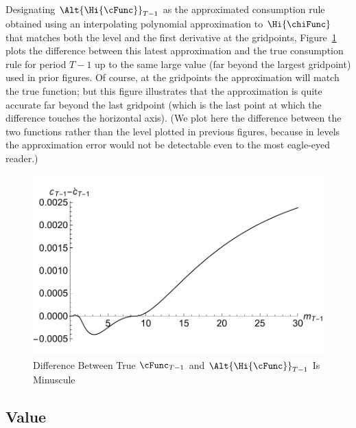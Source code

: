 \documentclass[titlepage, headings=optiontotocandhead]{\econtex}
\begin{document}
Designating $\Alt{\Hi{\cFunc}}_{T-1}$ as the approximated consumption rule
obtained using an interpolating polynomial approximation to $\Hi{\chiFunc}$
that matches both the level and the first derivative at the
gridpoints, Figure~\ref{fig:IntExpFOCInvPesReaOptGapPlot} plots the
difference between this latest approximation and the true consumption
rule for period $T-1$ up to the same large value (far beyond the
largest gridpoint) used in prior figures.  Of course, at the
gridpoints the approximation will match the true function; but this
figure illustrates that the approximation is quite accurate far beyond
the last gridpoint (which is the last point at which the difference
touches the horizontal axis).  (We plot here the difference between the
two functions rather than the level plotted in previous figures, because
in levels the approximation error would not be detectable even to the
most eagle-eyed reader.)



\hypertarget{IntExpFOCInvPesReaOptGapPlot}{}
\begin{figure}
  \includegraphics{./Figures/IntExpFOCInvPesReaOptGapPlot}
  \caption{Difference Between True $\cFunc_{T-1}$ and $\Alt{\Hi{\cFunc}}_{T-1}$ Is Minuscule}
  \label{fig:IntExpFOCInvPesReaOptGapPlot}
\end{figure}




\hypertarget{Value}{}
\subsection{Value}
\end{document}

